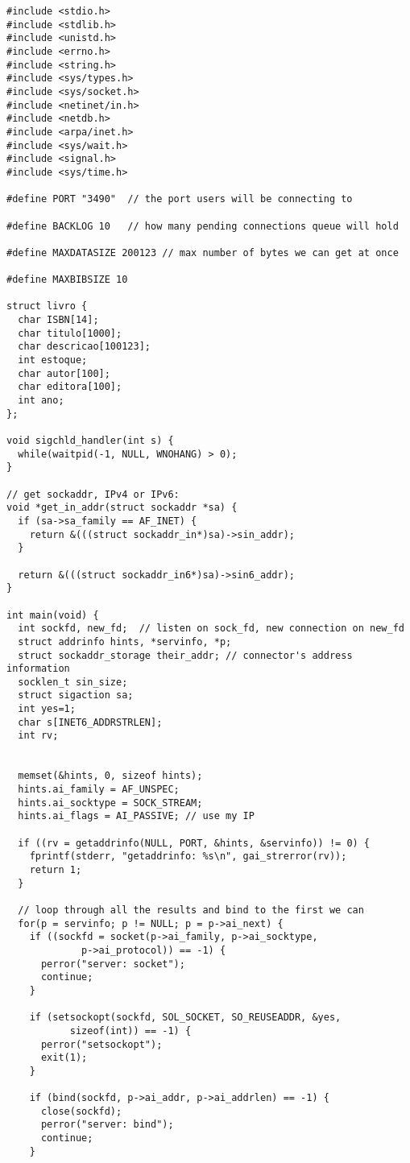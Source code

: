 \documentclass[11pt, brazil]{article} %
\begin{document}
\begin{verbatim}
#include <stdio.h>
#include <stdlib.h>
#include <unistd.h>
#include <errno.h>
#include <string.h>
#include <sys/types.h>
#include <sys/socket.h>
#include <netinet/in.h>
#include <netdb.h>
#include <arpa/inet.h>
#include <sys/wait.h>
#include <signal.h>
#include <sys/time.h>

#define PORT "3490"  // the port users will be connecting to

#define BACKLOG 10	 // how many pending connections queue will hold

#define MAXDATASIZE 200123 // max number of bytes we can get at once

#define MAXBIBSIZE 10

struct livro {
  char ISBN[14];
  char titulo[1000];
  char descricao[100123];
  int estoque;
  char autor[100];
  char editora[100];
  int ano;
};

void sigchld_handler(int s) {
  while(waitpid(-1, NULL, WNOHANG) > 0);
}

// get sockaddr, IPv4 or IPv6:
void *get_in_addr(struct sockaddr *sa) {
  if (sa->sa_family == AF_INET) {
    return &(((struct sockaddr_in*)sa)->sin_addr);
  }

  return &(((struct sockaddr_in6*)sa)->sin6_addr);
}

int main(void) {
  int sockfd, new_fd;  // listen on sock_fd, new connection on new_fd
  struct addrinfo hints, *servinfo, *p;
  struct sockaddr_storage their_addr; // connector's address information
  socklen_t sin_size;
  struct sigaction sa;
  int yes=1;
  char s[INET6_ADDRSTRLEN];
  int rv;


  memset(&hints, 0, sizeof hints);
  hints.ai_family = AF_UNSPEC;
  hints.ai_socktype = SOCK_STREAM;
  hints.ai_flags = AI_PASSIVE; // use my IP

  if ((rv = getaddrinfo(NULL, PORT, &hints, &servinfo)) != 0) {
    fprintf(stderr, "getaddrinfo: %s\n", gai_strerror(rv));
    return 1;
  }

  // loop through all the results and bind to the first we can
  for(p = servinfo; p != NULL; p = p->ai_next) {
    if ((sockfd = socket(p->ai_family, p->ai_socktype,
			 p->ai_protocol)) == -1) {
      perror("server: socket");
      continue;
    }

    if (setsockopt(sockfd, SOL_SOCKET, SO_REUSEADDR, &yes,
		   sizeof(int)) == -1) {
      perror("setsockopt");
      exit(1);
    }

    if (bind(sockfd, p->ai_addr, p->ai_addrlen) == -1) {
      close(sockfd);
      perror("server: bind");
      continue;
    }


\end{verbatim}
\end{document}
